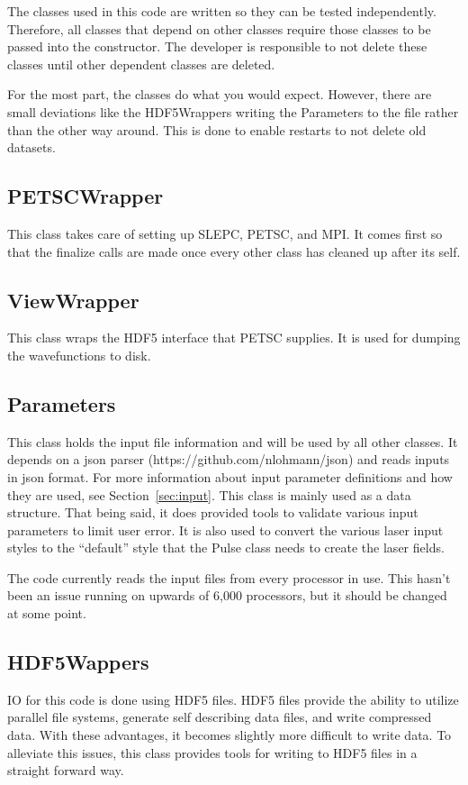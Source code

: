 \documentclass{article}
\begin{document}
The classes used in this code are written so they can be tested independently. Therefore, all classes that depend on other classes require those classes to be passed into the constructor. The developer is responsible to not delete these classes until other dependent classes are deleted.

For the most part, the classes do what you would expect. However, there are small deviations like the HDF5Wrappers writing the Parameters to the file rather than the other way around. This is done to enable restarts to not delete old datasets.

\subsection{PETSCWrapper} %
\label{sub:petscwrapper}
This class takes care of setting up SLEPC, PETSC, and MPI. It comes first so that the finalize calls are made once every other class has cleaned up after its self.

\subsection{ViewWrapper} %
\label{sub:viewwrapper}
This class wraps the HDF5 interface that PETSC supplies. It is used for dumping the wavefunctions to disk.

\subsection{Parameters} %
\label{sub:parameters}
This class holds the input file information and will be used by all other classes. It depends on a json parser (https://github.com/nlohmann/json) and reads inputs in json format. For more information about input parameter definitions and how they are used, see Section~\ref{sec:input}. This class is mainly used as a data structure. That being said, it does provided tools to validate various input parameters to limit user error. It is also used to convert the various laser input styles to the ``default'' style that the Pulse class needs to create the laser fields.

The code currently reads the input files from every processor in use. This hasn't been an issue running on upwards of 6,000 processors, but it should be changed at some point.


\subsection{HDF5Wappers} %
\label{sub:hdf5wappers}
IO for this code is done using HDF5 files. HDF5 files provide the ability to utilize parallel file systems, generate self describing data files, and write compressed data. With these advantages, it becomes slightly more difficult to write data. To alleviate this issues, this class provides tools for writing to HDF5 files in a straight forward way.
\end{document}
